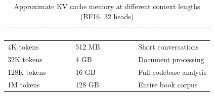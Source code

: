 \begin{table}[H]
\centering\small\sffamily
{}
\begin{tabular}{L{3.5cm}C{2.5cm}L{4.5cm}}
\toprule
{}\textcolor{white}{\textbf{Context Window}} & \textcolor{white}{\textbf{KV Cache (7B)}} & \textcolor{white}{\textbf{Use Case}} \\
\midrule
4K tokens & 512 MB & Short conversations \\
32K tokens & 4 GB & Document processing \\
128K tokens & 16 GB & Full codebase analysis \\
1M tokens & 128 GB & Entire book corpus \\
\bottomrule
\end{tabular}
\caption{Approximate KV cache memory at different context lengths (BF16, 32 heads)}
\end{table}



